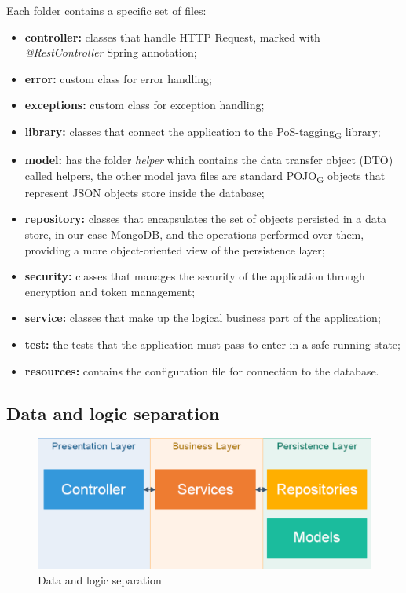 Each folder contains a specific set of files:
\begin{itemize}
\item  \textbf{controller:} classes that handle HTTP Request, marked with \textit{@RestController} Spring annotation;
\item  \textbf{error:} custom class for error handling;
\item  \textbf{exceptions:} custom class for exception handling;
\item  \textbf{library:} classes that connect the application to the {PoS-tagging}\textsubscript{G} library;
\item  \textbf{model:} has the folder \textit{helper} which contains the data transfer object (DTO) called helpers, the other model java files are standard {POJO}\textsubscript{G} objects that represent JSON objects store inside the database;
\item  \textbf{repository:} classes that encapsulates the set of objects persisted in a data store, in our case MongoDB, and the operations performed over them, providing a more object-oriented view of the persistence layer;
\item  \textbf{security:} classes that manages the security of the application through encryption and token management;
\item  \textbf{service:} classes that make up the logical business part of the application;
\item  \textbf{test:}  the tests that the application must pass to enter in a safe running state;
\item \textbf{resources:} contains the configuration file for connection to the database.
\end{itemize}

\subsection{Data and logic separation}
\begin{figure}[H]
\centering 
\includegraphics[scale=0.3]{uml/backendArchitecture.png} 
\caption{Data and logic separation}
\end{figure}

